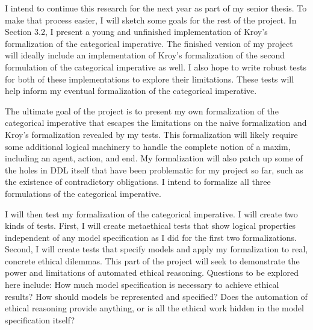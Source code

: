 %
\begin{isabellebody}%
%
%
\isadelimtheory
%
\endisadelimtheory
%
\isatagtheory
%
\endisatagtheory
{\isafoldtheory}%
%
\isadelimtheory
%
\endisadelimtheory
%
\isadelimdocument
%
\endisadelimdocument
%
\isatagdocument
%
\isamarkuptrue%
%
\endisatagdocument
{\isafolddocument}%
%
\isadelimdocument
%
\endisadelimdocument
%
\begin{isamarkuptext}%
I intend to continue this research for the next year as part of my senior thesis. To make that process
easier, I will sketch some goals for the rest of the project. In Section 3.2, I present a young and unfinished 
implementation of Kroy's formalization of the categorical imperative. The finished version of my project will 
ideally include an implementation of Kroy's formalization of the second formulation of the categorical imperative as well.
I also hope to write robust tests for both of these implementations to explore their limitations. These tests
will help inform my eventual formalization of the categorical imperative.

The ultimate goal of the project is to present my own formalization of the categorical imperative that escapes
the limitations on the naive formalization and Kroy's formalization revealed by my tests. This formalization
will likely require some additional logical machinery to handle the complete notion of a maxim, including 
an agent, action, and end. My formalization will also patch up some of the holes in DDL itself that have been
problematic for my project so far, such as the existence of contradictory obligations. I intend to formalize
all three formulations of the categorical imperative.

I will then test my formalization of the categorical imperative. I will create two kinds of tests. First,
I will create metaethical tests that show logical properties independent of any model specification as I did
for the first two formalizations. Second, I will create tests that specify models and apply my formalization
to real, concrete ethical dilemmas. This part of the project will seek to demonstrate the power and limitations of
automated ethical reasoning. Questions to be explored here include: How much model specification is necessary to 
achieve ethical results? How should models be represented and specified? Does the automation of ethical reasoning
provide anything, or is all the ethical work hidden in the model specification itself? 


\end{isamarkuptext}
\end{isabellebody}
